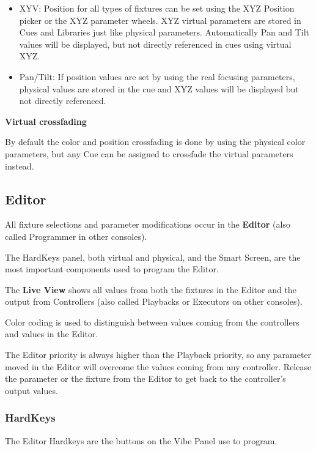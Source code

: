 \documentclass[
]{article}
\begin{document}
\begin{itemize}
\item
  XYV: Position for all types of fixtures can be set using the XYZ Position picker or the XYZ parameter wheels. XYZ virtual parameters are stored in Cues and Libraries just like physical parameters. Automatically Pan and Tilt values will be displayed, but not directly referenced in cues using virtual XYZ.
\item
  Pan/Tilt: If position values are set by using the real focusing parameters, physical values are stored in the cue and XYZ values will be displayed but not directly referenced.
\end{itemize}

\textbf{Virtual crossfading}

By default the color and position crossfading is done by using the physical color parameters, but any Cue can be assigned to crossfade the virtual parameters instead.

\hypertarget{Editor-6.4}{%
\subsection{Editor}\label{Editor-6.4}}

All fixture selections and parameter modifications occur in the \textbf{Editor} (also called Programmer in other consoles).

The HardKeys panel, both virtual and physical, and the Smart Screen, are the most important components used to program the Editor.

The \textbf{Live View} shows all values from both the fixtures in the Editor and the output from Controllers (also called Playbacks or Executors on other consoles).

Color coding is used to distinguish between values coming from the controllers and values in the Editor.

The Editor priority is always higher than the Playback priority, so any parameter moved in the Editor will overcome the values coming from any controller.
Release the parameter or the fixture from the Editor to get back to the controller's output values.

\hypertarget{hardkeys}{%
\subsubsection{HardKeys}\label{hardkeys}}

The Editor Hardkeys are the buttons on the Vibe Panel use to program.
\end{document}
